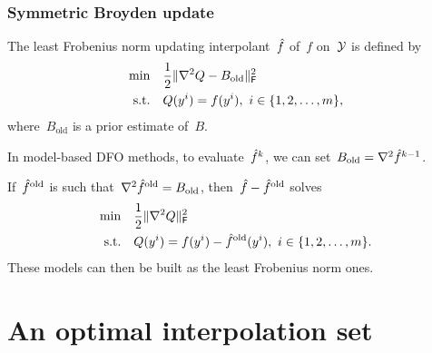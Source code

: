 \documentclass{polyu-presentation}
\newcommand{\obj}{f}
\newcommand{\objm}[1][]{\hat{f}\ifthenelse{\equal{#1}{}}{}{^{#1}}}
\newcommand{\xpt}[1][]{\mathcal{Y}\ifthenelse{\equal{#1}{}}{}{^{#1}}}
\begin{document}
\begin{frame}
    \frametitle{Symmetric Broyden update}

    The \alert{least Frobenius norm updating} interpolant~$\objm$ of~$\obj$ on~$\xpt$ is defined by
    \begin{align*}
        \min        & \quad \frac{1}{2} \norm{\nabla^2 Q - B_{\text{old}}}_{\mathsf{F}}^2    \\
        \text{s.t.} & \quad Q(y^i) = \obj(y^i), ~ i \in \set{1, 2, \dots, m},
    \end{align*}
    where~$B_{\text{old}}$ is a \alert{prior estimate} of~$B$.

    \begin{block}{}
        In model-based \alert{DFO methods}, to evaluate~$\objm[k]$, we can set~$B_{\text{old}} = \nabla^2 \objm[k - 1]$.
    \end{block}

    \medskip

    If~$\objm[\text{old}]$ is such that~$\nabla^2 \objm[\text{old}] = B_{\text{old}}$, then~$\objm - \objm[\text{old}]$ solves
    \begin{align*}
        \min        & \quad \frac{1}{2} \norm{\nabla^2 Q}_{\mathsf{F}}^2    \\
        \text{s.t.} & \quad Q(y^i) = \obj(y^i) - \objm[\text{old}](y^i), ~ i \in \set{1, 2, \dots, m}.
    \end{align*}
    These models can then be built as the least Frobenius norm ones.
\end{frame}

\section{An optimal interpolation set}
\end{document}
